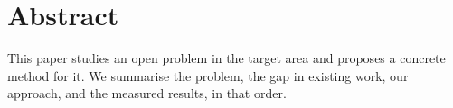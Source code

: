 \section{Abstract}

This paper studies an open problem in the target area and proposes a concrete
method for it. %
We summarise the problem, the gap in existing work, our approach, and the
measured results, in that order.
